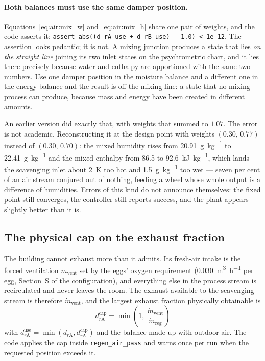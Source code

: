 \documentclass[11pt]{article}
\newcommand{\mdr}{\ensuremath{\dot m_{\mathrm{reg}}}}
\newcommand{\mdv}{\ensuremath{\dot m_{\mathrm{vent}}}}
\begin{document}
\paragraph{Both balances must use the same damper position.}
Equations~\eqref{eq:air:mix_w} and~\eqref{eq:air:mix_h} share one pair of
weights, and the code asserts it:
\verb|assert abs((d_rA_use + d_rB_use) - 1.0) < 1e-12|. The assertion looks
pedantic; it is not. A mixing junction produces a state that lies \emph{on the
straight line} joining its two inlet states on the psychrometric chart, and it
lies there precisely because water and enthalpy are apportioned with the same
two numbers. Use one damper position in the moisture balance and a different
one in the energy balance and the result is off the mixing line: a state that
no mixing process can produce, because mass and energy have been created in
different amounts.

An earlier version did exactly that, with weights that summed to $1.07$. The
error is not academic. Reconstructing it at the design point with weights
$(0.30,\,0.77)$ instead of $(0.30,\,0.70)$: the mixed humidity rises from
\SI{20.91}{\gram\per\kilogram} to \SI{22.41}{\gram\per\kilogram} and the mixed
enthalpy from \num{86.5} to \SI{92.6}{\kilo\joule\per\kilogram}, which lands
the scavenging inlet about \SI{2}{\kelvin} too hot and
\SI{1.5}{\gram\per\kilogram} too wet --- seven per cent of an air stream
conjured out of nothing, feeding a wheel whose whole output is a difference of
humidities. Errors of this kind do not announce themselves: the fixed point
still converges, the controller still reports success, and the plant appears
slightly better than it is.

\subsection{The physical cap on the exhaust fraction}
\label{sec:air:cap}

The building cannot exhaust more than it admits. Its fresh-air intake is the
forced ventilation $\mdv$ set by the eggs' oxygen requirement
(\SI{0.030}{\metre\cubed\per\hour} per egg, Section~S of the configuration),
and everything else in the process stream is recirculated and never leaves the
room. The exhaust available to the scavenging stream is therefore $\mdv$, and
the largest exhaust fraction physically obtainable is
\begin{equation}
\boxed{\;
d_{r\mathrm{A}}^{\mathrm{cap}} = \min\!\left(1,\ \frac{\mdv}{\mdr}\right)
\;}
\label{eq:air:cap}
\end{equation}
with $d_{r\mathrm{A}}^{\mathrm{use}} = \min(d_{r\mathrm{A}},
d_{r\mathrm{A}}^{\mathrm{cap}})$ and the balance made up with outdoor air. The
code applies the cap inside \texttt{regen\_air\_pass} and warns once per run
when the requested position exceeds it.
\end{document}

